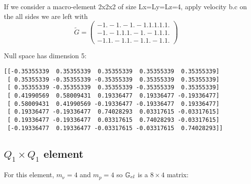 If we consider a macro-element 2x2x2 of size Lx=Ly=Lz=4, apply velocity b.c on the all sides
we are left with 
\[
\tilde{G} = 
\left(
\begin{array}{cccccc}
-1. -1. -1. -1.  1.  1.  1.  1.\\
-1. -1.  1.  1. -1. -1.  1.  1.\\
-1.  1. -1.  1. -1.  1. -1.  1.
\end{array}
\right)
\]

Null space has dimension 5:
\begin{verbatim}
[[-0.35355339  0.35355339  0.35355339  0.35355339  0.35355339]
 [ 0.35355339 -0.35355339 -0.35355339  0.35355339  0.35355339]
 [ 0.35355339 -0.35355339  0.35355339 -0.35355339  0.35355339]
 [ 0.41990569  0.58009431  0.19336477  0.19336477 -0.19336477]
 [ 0.58009431  0.41990569 -0.19336477 -0.19336477  0.19336477]
 [ 0.19336477 -0.19336477  0.74028293  0.03317615 -0.03317615]
 [ 0.19336477 -0.19336477  0.03317615  0.74028293 -0.03317615]
 [-0.19336477  0.19336477 -0.03317615 -0.03317615  0.74028293]]
\end{verbatim}





\subsection{$Q_1\times Q_1$ element}

For this element, $m_\upnu=4$ and $m_p=4$ so ${\mathbb{G}}_{el}$ is
a $8\times 4$ matrix:

